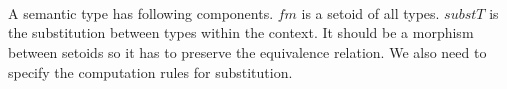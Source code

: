 \begin{code}\>\<%
\\
%
\\
\> \AgdaSymbol{=} \<%
\\
%
\\
\> \AgdaSymbol{=} \<%
\\
%
\\
\> \AgdaSymbol{=} \<%
\\
%
\\
\>\<\end{code}

A semantic type has following components. $fm$ is a setoid of all types. $substT$ is the substitution between types within the context. It should be a morphism between setoids so it has to preserve the equivalence relation. We also need to specify the computation rules for substitution.

